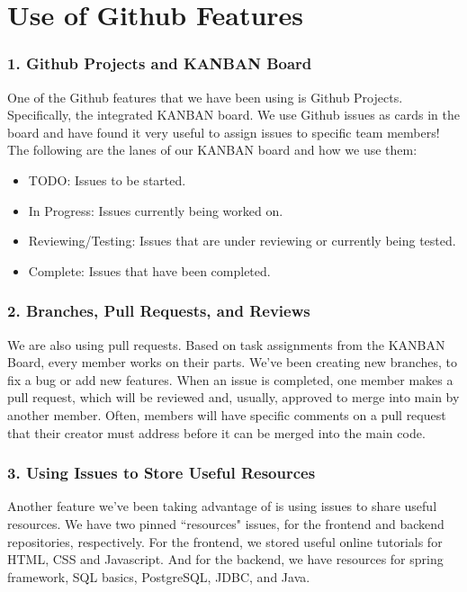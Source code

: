 \documentclass[fontsize=14pt]{article}
\begin{document}
\section*{Use of Github Features}

\subsubsection*{1. Github Projects and KANBAN Board}

One of the Github features that we have been using is Github Projects. Specifically, the integrated KANBAN board. We use Github issues as cards in the board and have found it very useful to assign issues to specific team members! The following are the lanes of our KANBAN board and how we use them:

\begin{itemize}
    \item TODO: Issues to be started.
    \item In Progress: Issues currently being worked on.
    \item Reviewing/Testing: Issues that are under reviewing or currently being tested.
    \item Complete: Issues that have been completed.
\end{itemize}

\subsubsection*{2. Branches, Pull Requests, and Reviews}

We are also using pull requests. Based on task assignments from the KANBAN Board, every member works on their parts. We've been creating new branches, to fix a bug or add new features. When an issue is completed, one member makes a pull request, which will be reviewed and, usually, approved to merge into main by another member. Often, members will have specific comments on a pull request that their creator must address before it can be merged into the main code.

\subsubsection*{3. Using Issues to Store Useful Resources}

Another feature we've been taking advantage of is using issues to share useful resources. We have two pinned ``resources" issues, for the frontend and backend repositories, respectively. For the frontend, we stored useful online tutorials for HTML, CSS and Javascript. And for the backend, we have resources for spring framework, SQL basics, PostgreSQL, JDBC, and Java.
\end{document}
